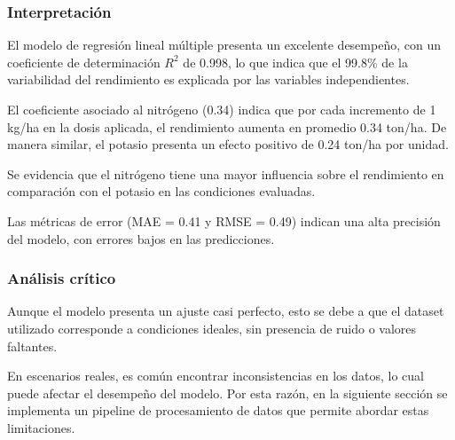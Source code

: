\subsubsection{Interpretación}

El modelo de regresión lineal múltiple presenta un excelente desempeño, con un coeficiente de determinación $R^2$ de 0.998, lo que indica que el 99.8\% de la variabilidad del rendimiento es explicada por las variables independientes.

El coeficiente asociado al nitrógeno (0.34) indica que por cada incremento de 1 kg/ha en la dosis aplicada, el rendimiento aumenta en promedio 0.34 ton/ha. De manera similar, el potasio presenta un efecto positivo de 0.24 ton/ha por unidad.

Se evidencia que el nitrógeno tiene una mayor influencia sobre el rendimiento en comparación con el potasio en las condiciones evaluadas.

Las métricas de error (MAE = 0.41 y RMSE = 0.49) indican una alta precisión del modelo, con errores bajos en las predicciones.

\subsubsection{Análisis crítico}

Aunque el modelo presenta un ajuste casi perfecto, esto se debe a que el dataset utilizado corresponde a condiciones ideales, sin presencia de ruido o valores faltantes.

En escenarios reales, es común encontrar inconsistencias en los datos, lo cual puede afectar el desempeño del modelo. Por esta razón, en la siguiente sección se implementa un pipeline de procesamiento de datos que permite abordar estas limitaciones.